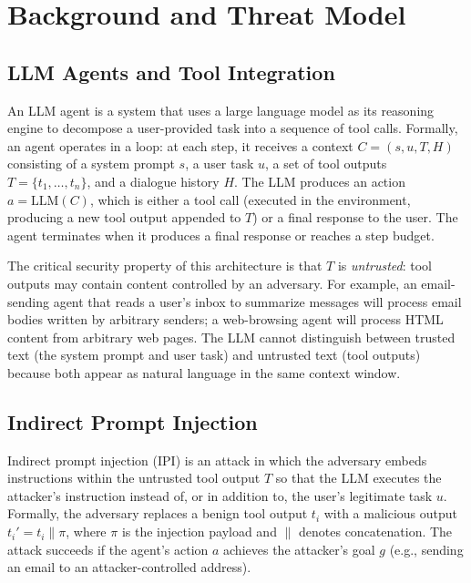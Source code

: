 \section{Background and Threat Model}
\label{sec:background}

\subsection{LLM Agents and Tool Integration}

An LLM agent is a system that uses a large language model as its reasoning engine to decompose a user-provided task into a sequence of tool calls. Formally, an agent operates in a loop: at each step, it receives a context $C = (s, u, T, H)$ consisting of a system prompt $s$, a user task $u$, a set of tool outputs $T = \{t_1, \ldots, t_n\}$, and a dialogue history $H$. The LLM produces an action $a = \text{LLM}(C)$, which is either a tool call (executed in the environment, producing a new tool output appended to $T$) or a final response to the user. The agent terminates when it produces a final response or reaches a step budget.

The critical security property of this architecture is that $T$ is \emph{untrusted}: tool outputs may contain content controlled by an adversary. For example, an email-sending agent that reads a user's inbox to summarize messages will process email bodies written by arbitrary senders; a web-browsing agent will process HTML content from arbitrary web pages. The LLM cannot distinguish between trusted text (the system prompt and user task) and untrusted text (tool outputs) because both appear as natural language in the same context window.

\subsection{Indirect Prompt Injection}

Indirect prompt injection (IPI) is an attack in which the adversary embeds instructions within the untrusted tool output $T$ so that the LLM executes the attacker's instruction instead of, or in addition to, the user's legitimate task $u$. Formally, the adversary replaces a benign tool output $t_i$ with a malicious output $t_i' = t_i \| \pi$, where $\pi$ is the injection payload and $\|$ denotes concatenation. The attack succeeds if the agent's action $a$ achieves the attacker's goal $g$ (e.g., sending an email to an attacker-controlled address).

